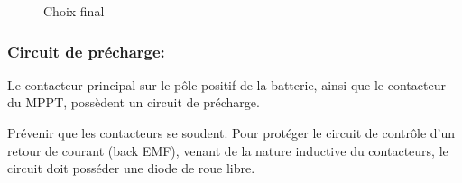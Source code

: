 		\begin{figure}[H]
			\centering
			\caption[Choix final]{Choix final}
			\label{fig:contactorsolfinal}
		\end{figure}
		


	\subsubsection*{Circuit de précharge:}
	
	Le contacteur principal sur le pôle positif de la batterie, ainsi que le contacteur du MPPT, possèdent un circuit de précharge.

	Prévenir que les contacteurs se soudent.
	Pour protéger le circuit de contrôle d'un retour de courant (back EMF), venant de la nature inductive du contacteurs, le circuit doit posséder une diode de roue libre. 


	
	
